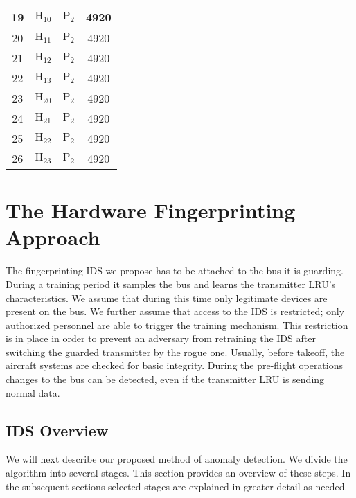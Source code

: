 \documentclass[english]{llncs}
\newcommand{\level}[1]{\section{#1}}
\newcommand{\sublevel}[1]{\subsection{#1}}
\newcommand{\level}[1]{\chapter{#1}}
\newcommand{\sublevel}[1]{\section{#1}}
\begin{document}
\begin{table}[t]
\begin{tabular}{|c | c c c|}
      19 & \(\text{H}_{10}\) & \(\text{P}_2\) & 4920 \\
      \hline
      20 & \(\text{H}_{11}\) & \(\text{P}_2\) & 4920 \\
      \hline
      21 & \(\text{H}_{12}\) & \(\text{P}_2\) & 4920 \\
      \hline
      22 & \(\text{H}_{13}\) & \(\text{P}_2\) & 4920 \\
      \hline
      23 & \(\text{H}_{20}\) & \(\text{P}_2\) & 4920 \\
      \hline
      24 & \(\text{H}_{21}\) & \(\text{P}_2\) & 4920 \\
      \hline
      25 & \(\text{H}_{22}\) & \(\text{P}_2\) & 4920 \\
      \hline
      26 & \(\text{H}_{23}\) & \(\text{P}_2\) & 4920 \\
      \hline
    \end{tabular}
  \end{table}
    
\vspace*{-2ex} %
\level{The Hardware Fingerprinting Approach} \label{Approach}
\vspace*{-1ex} %
  The fingerprinting IDS we propose has to be attached to the bus it is guarding. During a training period it samples the bus and learns the transmitter LRU's characteristics. We assume that during this time only legitimate devices are present on the bus. We further assume that access to the IDS is restricted;
  only authorized personnel are able to trigger the training mechanism. This restriction is in place in order to prevent an adversary from retraining the IDS after switching the guarded transmitter by the rogue one. Usually, before takeoff, the aircraft systems are checked for basic integrity.
  During the pre-flight operations changes to the bus can be detected, even if the transmitter LRU is sending normal data.

\vspace*{-2ex} %
\sublevel{IDS Overview} \label{Overview}
\vspace*{-1ex} %
  We will next describe our proposed method of anomaly detection. We divide the algorithm into several stages. This section provides an overview of these steps. In the subsequent sections selected stages are explained in greater detail as needed.
  
\end{document}
